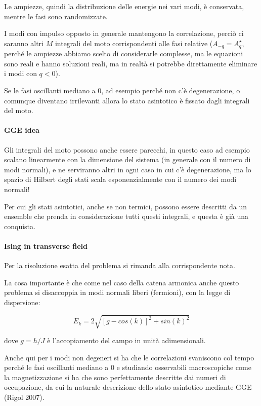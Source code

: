 \documentclass[a4paper,10pt,twocolumn]{article}
\begin{document}
\noindent Le ampiezze, quindi la distribuzione delle energie nei vari modi, è conservata, mentre le fasi sono randomizzate.

I modi con impulso opposto in generale mantengono la correlazione, perciò ci saranno altri $M$ integrali del moto corrispondenti alle fasi relative ($A_{-q} = A_q^\star$, perché le ampiezze abbiamo scelto di considerarle complesse, ma le equazioni sono reali e hanno soluzioni reali, ma in realtà si potrebbe direttamente eliminare i modi con $q < 0$).

Se le fasi oscillanti mediano a $0$, ad esempio perché non c'è degenerazione, o comunque diventano irrilevanti allora lo stato asintotico è fissato dagli integrali del moto.

\paragraph{GGE idea} Gli integrali del moto possono anche essere parecchi, in questo caso ad esempio scalano linearmente con la dimensione del sistema (in generale con il numero di modi normali), e ne serviranno altri in ogni caso in cui c'è degenerazione, ma lo spazio di Hilbert degli stati scala esponenzialmente con il numero dei modi normali!

Per cui gli stati asintotici, anche se non termici, possono essere descritti da un ensemble che prenda in considerazione tutti questi integrali, e questa è già una conquista.

\paragraph{Ising in transverse field} Per la risoluzione esatta del problema si rimanda alla corrispondente nota.

La cosa importante è che come nel caso della catena armonica anche questo problema si disaccoppia in modi normali liberi (fermioni), con la legge di dispersione:

\begin{equation}
E_k = 2\sqrt{[g - cos(k)]^2 + sin(k)^2}
\end{equation}

dove $g = h/J$ è l'accopiamento del campo in unità adimensionali. 

Anche qui per i modi non degeneri si ha che le correlazioni svaniscono col tempo perché le fasi oscillanti mediano a $0$ e studiando osservabili macroscopiche come la magnetizzazione si ha che sono perfettamente descritte dai numeri di occupazione, da cui la naturale descrizione dello stato asintotico mediante GGE (Rigol 2007).
\end{document}
